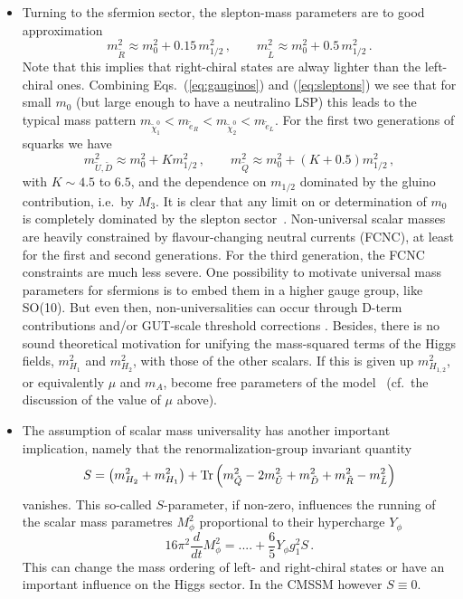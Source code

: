 \begin{itemize}
\item Turning to the sfermion sector, the slepton-mass parameters are to good approximation
\begin{equation}
  m_{\tilde R}^2 \approx m_0^2 + 0.15\,m_{1/2}^2\,, \qquad 
  m_{\tilde L}^2 \approx m_0^2 + 0.5\,m_{1/2}^2\,. 
  \label{eq:sleptons}
\end{equation}
Note that this implies that right-chiral states are alway lighter 
than the left-chiral ones. Combining Eqs.~(\ref{eq:gauginos}) and 
(\ref{eq:sleptons}) we see that for small $m_0$ (but large enough 
to have a neutralino LSP) this leads to the typical mass pattern 
$m_{\tilde\chi^0_1}<m_{\tilde e_R}<m_{\tilde\chi^0_2}<m_{\tilde e_L}$.  
For the first two generations of squarks we have 
\begin{equation}
  m_{\tilde U, \tilde D}^2 \approx m_0^2 + K m_{1/2}^2\,, \qquad 
  m_{\tilde Q}^2 \approx m_0^2 + (K+0.5)m_{1/2}^2\,, 
\end{equation}
with $K\sim4.5$ to $6.5$, and the dependence on $m_{1/2}$ dominated by the 
gluino contribution, i.e.\ by $M_3$. It is clear that any limit on 
or determination of $m_0$ is completely dominated by the slepton 
sector~\cite{Allanach:2006fy}. 
Non-universal scalar masses are heavily constrained by flavour-changing 
neutral currents (FCNC), at least for the first and second generations. 
For the third generation, the FCNC constraints are much less severe. 
One possibility to motivate universal mass parameters for sfermions is 
to embed them in a higher gauge group, like SO(10). But even then, 
non-universalities can occur through D-term contributions \cite{Kolda:1995iw} 
and/or GUT-scale threshold corrections \cite{Polonsky:1994sr,Polonsky:1994rz}. 
Besides, there is no sound theoretical motivation for unifying the 
mass-squared terms of the Higgs fields, $m_{H_1}^2$ and $m_{H_2}^2$,
with those of the other scalars. 
If this is given up $m_{H_{1,2}}^2$, or equivalently $\mu$ and $m_A$,
become free parameters of the model~\cite{Ellis:2002wv} 
(cf.\ the discussion of the value of $\mu$ above).

\item The assumption of scalar mass universality has another important 
implication, namely that the renormalization-group invariant quantity  
\begin{equation}
  S = \left(m_{H_2}^2+m_{H_1}^2\right) + {\rm Tr}\left(
      m_{\tilde Q}^2-2m_{\tilde U}^2+m_{\tilde D}^2
      +m_{\tilde R}^2-m_{\tilde L}^2\right)
\end{equation}
vanishes. This so-called $S$-parameter, if non-zero, influences 
the running of the scalar mass parametres $M_\phi^2$ proportional to 
their hypercharge $Y_\phi$
\begin{equation}
   16\pi^2\frac{d}{dt}M_\phi^2= .... + \frac{6}{5}Y_\phi g_1^2S\,.
\end{equation}
This can change the mass ordering of left- and right-chiral states 
or have an important influence on the Higgs sector. 
In the CMSSM however $S\equiv 0$.

\end{itemize}

